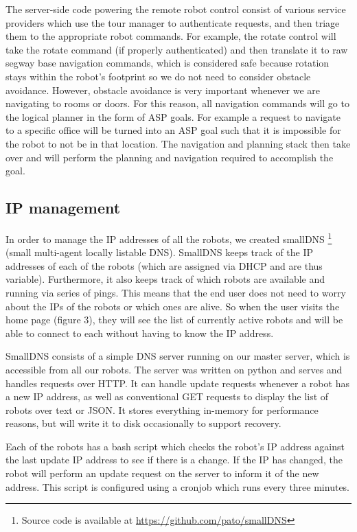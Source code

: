 \documentclass[
  oneside,
  11pt, a4paper,
  footinclude=true,
  headinclude=true,
  cleardoublepage=empty
]{article}
\begin{document}
The server-side code powering the remote robot control consist of various
service providers which use the tour manager to authenticate requests, and then
triage them to the appropriate robot commands. For example, the rotate control
will take the rotate command (if properly authenticated) and then translate it
to raw segway base navigation commands, which is considered safe because
rotation stays within the robot's footprint so we do not need to consider
obstacle avoidance. However, obstacle avoidance is very important whenever we
are navigating to rooms or doors. For this reason, all navigation commands will
go to the logical planner in the form of ASP goals. For example a request to
navigate to a specific office will be turned into an ASP goal such that it is
impossible for the robot to not be in that location. The navigation and
planning stack then take over and will perform the planning and navigation
required to accomplish the goal.

\subsection{IP management}

In order to manage the IP addresses of all the robots, we created smallDNS
\footnote{Source code is available at \url{https://github.com/pato/smallDNS}}
(small multi-agent locally listable DNS). SmallDNS keeps track of the IP
addresses of each of the robots (which are assigned via DHCP and are thus
variable). Furthermore, it also keeps track of which robots are available and
running via series of pings. This means that the end user does not need to
worry about the IPs of the robots or which ones are alive. So when the user
visits the home page (figure 3), they will see the list of currently active
robots and will be able to connect to each without having to know the IP
address.

SmallDNS consists of a simple DNS server running on our master server, which is
accessible from all our robots. The server was written on python and serves and
handles requests over HTTP. It can handle update requests whenever a robot has
a new IP address, as well as conventional GET requests to display the list of
robots over text or JSON. It stores everything in-memory for performance
reasons, but will write it to disk occasionally to support recovery.

Each of the robots has a bash script which checks the robot's IP address against the
last update IP address to see if there is a change. If the IP has changed, the robot
will perform an update request on the server to inform it of the new address. This
script is configured using a cronjob which runs every three minutes.
\end{document}
